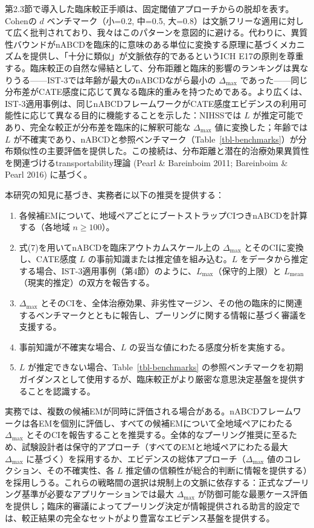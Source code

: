 \documentclass[
  a4paper,
  11pt]{ltjsarticle}
\providecommand{\tightlist}{%
  \setlength{\itemsep}{0pt}\setlength{\parskip}{0pt}}\usepackage{longtable,booktabs,array}
\begin{document}
第2.3節で導入した臨床較正手順は、固定閾値アプローチからの脱却を表す。Cohenの
\(d\) ベンチマーク（小=0.2, 中=0.5,
大=0.8）は文脈フリーな適用に対して広く批判されており、我々はこのパターンを意図的に避ける。代わりに、異質性バウンドがnABCDを臨床的に意味のある単位に変換する原理に基づくメカニズムを提供し、「十分に類似」が文脈依存的であるというICH
E17の原則を尊重する。臨床較正の自然な帰結として、分布距離と臨床的影響のランキングは異なりうる------IST-3では年齢が最大のnABCDながら最小の
\(\Delta_{\max}\)
であった------同じ分布差がCATE感度に応じて異なる臨床的重みを持つためである。より広くは、IST-3適用事例は、同じnABCDフレームワークがCATE感度エビデンスの利用可能性に応じて異なる目的に機能することを示した：NIHSSでは
\(L\) が推定可能であり、完全な較正が分布差を臨床的に解釈可能な
\(\Delta_{\max}\) 値に変換した；年齢では \(L\)
が不確実であり、nABCDと参照ベンチマーク（Table~\ref{tbl-benchmarks}）が分布類似性の主要評価を提供した。この接続は、分布距離と潜在的治療効果異質性を関連づけるtransportability理論
(Pearl \& Bareinboim 2011; Bareinboim \& Pearl 2016) に基づく。

本研究の知見に基づき、実務者に以下の推奨を提供する：

\begin{enumerate}
\def\labelenumi{\arabic{enumi}.}
\tightlist
\item
  各候補EMについて、地域ペアごとにブートストラップCIつきnABCDを計算する（各地域
  \(n \geq 100\)）。
\item
  式(7)を用いてnABCDを臨床アウトカムスケール上の \(\Delta_{\max}\)
  とそのCIに変換し、CATE感度 \(L\)
  の事前知識または推定値を組み込む。\(L\)
  をデータから推定する場合、IST-3適用事例（第4節）のように、\(L_{\max}\)（保守的上限）と
  \(L_{\text{mean}}\)（現実的推定）の双方を報告する。
\item
  \(\Delta_{\max}\)
  とそのCIを、全体治療効果、非劣性マージン、その他の臨床的に関連するベンチマークとともに報告し、プーリングに関する情報に基づく審議を支援する。
\item
  事前知識が不確実な場合、\(L\) の妥当な値にわたる感度分析を実施する。
\item
  \(L\) が推定できない場合、Table~\ref{tbl-benchmarks}
  の参照ベンチマークを初期ガイダンスとして使用するが、臨床較正がより厳密な意思決定基盤を提供することを認識する。
\end{enumerate}

実務では、複数の候補EMが同時に評価される場合がある。nABCDフレームワークは各EMを個別に評価し、すべての候補EMについて全地域ペアにわたる
\(\Delta_{\max}\)
とそのCIを報告することを推奨する。全体的なプーリング推奨に至るため、試験設計者は保守的アプローチ（すべてのEMと地域ペアにわたる最大
\(\Delta_{\max}\)
に基づく）を採用するか、エビデンスの総体アプローチ（\(\Delta_{\max}\)
値のコレクション、その不確実性、各 \(L\)
推定値の信頼性が総合的判断に情報を提供する）を採用しうる。これらの戦略間の選択は規制上の文脈に依存する：正式なプーリング基準が必要なアプリケーションでは最大
\(\Delta_{\max}\)
が防御可能な最悪ケース評価を提供し；臨床的審議によってプーリング決定が情報提供される助言的設定では、較正結果の完全なセットがより豊富なエビデンス基盤を提供する。
\end{document}
